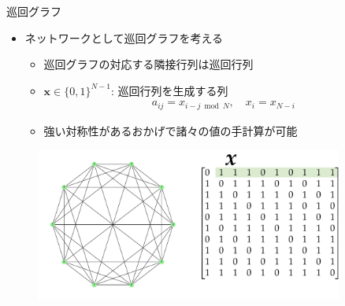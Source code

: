 \begin{frame}{巡回グラフ}
\begin{itemize}
\item ネットワークとして巡回グラフを考える
\begin{itemize}
    \item 巡回グラフの対応する隣接行列は巡回行列
    \item $\bm{x}\in\{0,1\}^{N-1}$: 巡回行列を生成する列
    \begin{align*}
        a_{ij}=x_{i-j\bmod N},
        \quad x_{i}=x_{N-i}
    \end{align*}
    \item 強い対称性があるおかげで諸々の値の手計算が可能
\end{itemize}
\end{itemize}
\begin{figure}
    \centering
    \includegraphics[width=0.9\textwidth]{figs/circulant_graph_matrix.pdf}
\end{figure}
\end{frame}

